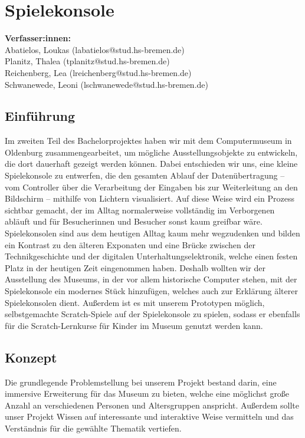 \chapter{Spielekonsole}
\textbf{Verfasser:innen:} \\
Abatielos, Loukas (labatielos@stud.hs-bremen.de) \\
Planitz, Thalea (tplanitz@stud.hs-bremen.de) \\
Reichenberg, Lea (lreichenberg@stud.hs-bremen.de) \\
Schwanewede, Leoni (lschwanewede@stud.hs-bremen.de) \\ [1cm]

\section{Einführung}
Im zweiten Teil des Bachelorprojektes haben wir mit dem Computermuseum in Oldenburg zusammengearbeitet, um mögliche Ausstellungsobjekte zu entwickeln, die dort dauerhaft gezeigt werden können. Dabei entschieden wir uns, eine kleine Spielekonsole zu entwerfen, die den gesamten Ablauf der Datenübertragung – vom Controller über die Verarbeitung der Eingaben bis zur Weiterleitung an den Bildschirm – mithilfe von Lichtern visualisiert. Auf diese Weise wird ein Prozess sichtbar gemacht, der im Alltag normalerweise vollständig im Verborgenen abläuft und für Besucherinnen und Besucher sonst kaum greifbar wäre. \\

Spielekonsolen sind aus dem heutigen Alltag kaum mehr wegzudenken und bilden ein Kontrast zu den älteren Exponaten und eine Brücke zwischen der Technikgeschichte und der digitalen Unterhaltungselektronik, welche einen festen Platz in der heutigen Zeit eingenommen haben. Deshalb wollten wir der Ausstellung des Museums, in der vor allem historische Computer stehen, mit der Spielekonsole ein modernes Stück hinzufügen, welches auch zur Erklärung älterer Spielekonsolen dient. Außerdem ist es mit unserem Prototypen möglich, selbstgemachte Scratch-Spiele auf der Spielekonsole zu spielen, sodass er ebenfalls für die Scratch-Lernkurse für Kinder im Museum genutzt werden kann.


\section{Konzept}
Die grundlegende Problemstellung bei unserem Projekt bestand darin, eine immersive Erweiterung für das Museum zu bieten, welche eine möglichst große Anzahl an verschiedenen Personen und Altersgruppen anspricht. Außerdem sollte unser Projekt Wissen auf interessante und interaktive Weise vermitteln und das Verständnis für die gewählte Thematik vertiefen.

